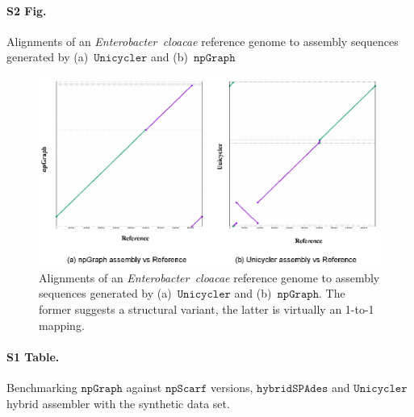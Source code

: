 \documentclass[10pt,letterpaper]{article}
\newcommand{\npscarf}{$\mathtt{npScarf}$}
\newcommand{\npgraph}{$\mathtt{npGraph}$}
\newcommand{\unicycler}{$\mathtt{Unicycler}$}
\begin{document}
\paragraph*{S2 Fig.}
\label{S2_Fig} Alignments of an \emph{Enterobacter~cloacae} reference genome to assembly sequences generated by  (a)~\unicycler{} and (b)~\npgraph{}

\begin{figure}[!ht]
 \includegraphics[width=\textwidth]{images/FigS2.eps}
 \caption{Alignments of an \emph{Enterobacter~cloacae} reference genome to assembly sequences generated by  (a)~\unicycler{} and (b)~\npgraph{}. The former suggests a structural variant, the latter is virtually an 1-to-1 mapping.}
\end{figure}

\clearpage
\paragraph*{S1 Table.}
\label{S1_Table}
Benchmarking \npgraph{} against \npscarf{} versions, $\mathtt{hybridSPAdes}$ and \unicycler{} hybrid assembler with the synthetic data set.

\makeatletter

\newlength\oriarrayrulewidth  
\newcount\orilowpenalty
\newcommand\nobreakmidrule{%
 \noalign{\global\oriarrayrulewidth\arrayrulewidth\relax
          \global\orilowpenalty\@lowpenalty\relax  
          \global\@lowpenalty=\numexpr-10000\relax%
          \global\arrayrulewidth\lightrulewidth\relax}
 \hline
 \noalign{\global\@lowpenalty=\orilowpenalty\relax%
          \global\arrayrulewidth\oriarrayrulewidth\relax}}

\makeatother
\setlength{\LTleft}{-1in}
\setcounter{table}{0}  
\end{document}
